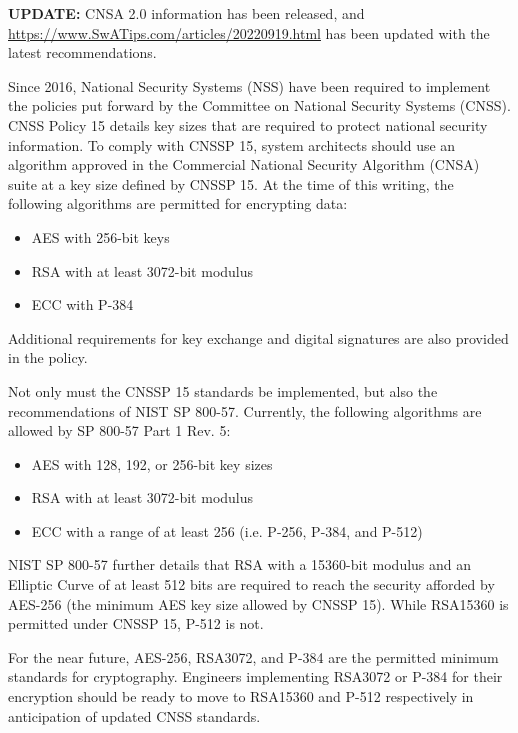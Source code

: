 \textbf{UPDATE:} CNSA 2.0 information has been released, and \url{https://www.SwATips.com/articles/20220919.html} has been updated with the latest recommendations.

Since 2016, National Security Systems (NSS) have been required to implement the policies put forward by the Committee on National Security Systems (CNSS). CNSS Policy 15 details key sizes that are required to protect national security information.\autocite{20220328:cnssp15} To comply with CNSSP 15, system architects should use an algorithm approved in the Commercial National Security Algorithm (CNSA) suite at a key size defined by CNSSP 15. At the time of this writing, the following algorithms are permitted for encrypting data:
\begin{itemize}
	\item AES with 256-bit keys
	\item RSA with at least 3072-bit modulus
	\item ECC with P-384
\end{itemize}
Additional requirements for key exchange and digital signatures are also provided in the policy.

Not only must the CNSSP 15 standards be implemented, but also the recommendations of NIST SP 800-57.\autocite{20220328:nist80057p1r5} Currently, the following algorithms are allowed by SP 800-57 Part 1 Rev. 5:
\begin{itemize}
	\item AES with 128, 192, or 256-bit key sizes
	\item RSA with at least 3072-bit modulus
	\item ECC with a range of at least 256 (i.e. P-256, P-384, and P-512)
\end{itemize}
NIST SP 800-57 further details that RSA with a 15360-bit modulus and an Elliptic Curve of at least 512 bits are required to reach the security afforded by AES-256 (the minimum AES key size allowed by CNSSP 15). While RSA15360 is permitted under CNSSP 15, P-512 is not.

For the near future, AES-256, RSA3072, and P-384 are the permitted minimum standards for cryptography. Engineers implementing RSA3072 or P-384 for their encryption should be ready to move to RSA15360 and P-512 respectively in anticipation of updated CNSS standards.
